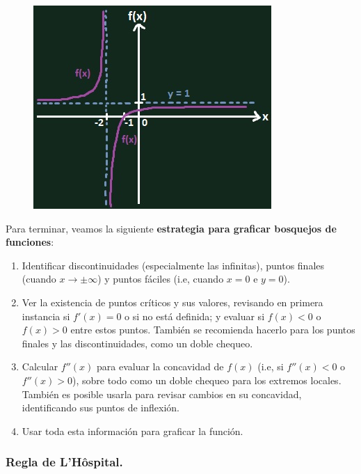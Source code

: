 \documentclass[12pt]{article}
\begin{document}
\begin{figure}[hbt!]
\centering
\includegraphics[scale=0.85]{img/draft-asymptote.jpg}
\end{figure}

\newpage

Para terminar, veamos la siguiente \textbf{estrategia para graficar bosquejos de funciones}:

\begin{enumerate}

\item Identificar discontinuidades (especialmente las infinitas), puntos finales (cuando $x \to \pm \infty$) y puntos fáciles (i.e, cuando $x = 0$ e $y = 0$).

\item Ver la existencia de puntos críticos y sus valores, revisando en primera instancia si $f'(x) = 0$ o si no está definida; y evaluar si $f(x) < 0$ o $f(x) > 0$ entre estos puntos. También se recomienda hacerlo para los puntos finales y las discontinuidades, como un doble chequeo.

\item Calcular $f''(x)$ para evaluar la concavidad de $f(x)$ (i.e, si $f''(x) < 0$ o $f''(x) > 0$), sobre todo como un doble chequeo para los extremos locales. También es posible usarla para revisar cambios en su concavidad, identificando sus puntos de inflexión.

\item Usar toda esta información para graficar la función.

\end{enumerate}


\subsubsection{Regla de L'Hôspital.}
\end{document}
